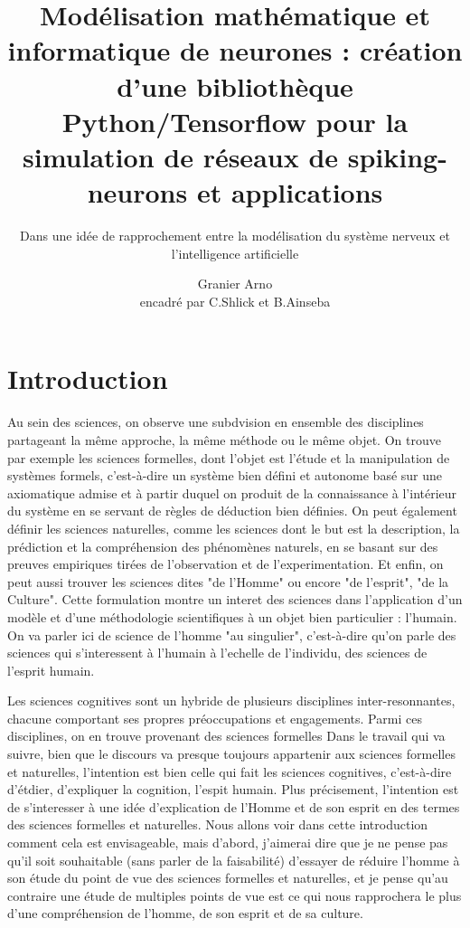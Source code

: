 \documentclass[12pt]{scrartcl}
\title{Modélisation mathématique et informatique de neurones : création d'une bibliothèque Python/Tensorflow pour la simulation de réseaux de spiking-neurons et applications}
\subtitle{Dans une idée de rapprochement entre la modélisation du système nerveux et l'intelligence artificielle}
\author{Granier Arno \\ encadré par C.Shlick et B.Ainseba}
\begin{document}
\maketitle

\tableofcontents

\pagebreak


\section{Introduction}
	
	

Au sein des sciences, on observe une subdvision en ensemble des disciplines partageant la même approche, la même méthode ou le même objet. On trouve par exemple les sciences formelles, dont l'objet est l'étude et la manipulation de systèmes formels, c'est-à-dire un système bien défini et autonome basé sur une axiomatique admise et à partir duquel on produit de la connaissance à l'intérieur du système en se servant de règles de déduction bien définies. On peut également définir les sciences naturelles, comme les sciences dont le but est la description, la prédiction et la compréhension des phénomènes naturels, en se basant sur des preuves empiriques tirées de l'observation et de l'experimentation. Et enfin, on peut aussi trouver les sciences dites "de l'Homme" ou encore "de l'esprit", "de la Culture". Cette formulation montre un interet des sciences dans l'application d'un modèle et d'une méthodologie scientifiques à un objet bien particulier : l'humain. On va parler ici de science de l'homme "au singulier", c'est-à-dire qu'on parle des sciences qui s'interessent à l'humain à l'echelle de l'individu, des sciences de l'esprit humain.


	 Les sciences cognitives sont un hybride de plusieurs disciplines inter-resonnantes, chacune comportant ses propres préoccupations et engagements. Parmi ces disciplines, on en trouve provenant des sciences formelles  Dans le travail qui va suivre, bien que le discours va presque toujours appartenir aux sciences formelles et naturelles, l'intention est bien celle qui fait les sciences cognitives, c'est-à-dire d'étdier, d'expliquer la cognition, l'espit humain. Plus précisement, l'intention est de s'interesser à une idée d'explication de l'Homme et de son esprit en des termes des sciences formelles et naturelles. Nous allons voir dans cette introduction comment cela est envisageable, mais d'abord, j'aimerai dire que je ne pense pas qu'il soit souhaitable (sans parler de la faisabilité) d'essayer de réduire l'homme à son étude du point de vue des sciences formelles et naturelles, et je pense qu'au contraire une étude de multiples points de vue est ce qui nous rapprochera le plus d'une compréhension de l'homme, de son esprit et de sa culture.
\end{document}
